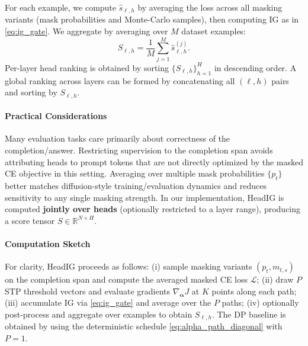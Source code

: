 For each example, we compute $\hat{s}_{\ell,h}$ by averaging the loss across all masking variants (mask probabilities and Monte-Carlo samples), then computing IG as in \eqref{eq:ig_gate}. We aggregate by averaging over $M$ dataset examples:
\begin{equation}
S_{\ell,h} = \frac{1}{M}\sum_{j=1}^{M} \hat{s}^{(j)}_{\ell,h}.
\end{equation}
Per-layer head ranking is obtained by sorting $\{S_{\ell,h}\}_{h=1}^{H}$ in descending order. A global ranking across layers can be formed by concatenating all $(\ell,h)$ pairs and sorting by $S_{\ell,h}$.

\paragraph*{Practical Considerations}
Many evaluation tasks care primarily about correctness of the completion/answer. Restricting supervision to the completion span avoids attributing heads to prompt tokens that are not directly optimized by the masked CE objective in this setting. Averaging over multiple mask probabilities $\{p_t\}$ better matches diffusion-style training/evaluation dynamics and reduces sensitivity to any single masking strength. In our implementation, HeadIG is computed \textbf{jointly over heads} (optionally restricted to a layer range), producing a score tensor $S \in \mathbb{R}^{N \times H}$.

\paragraph*{Computation Sketch}
For clarity, HeadIG proceeds as follows: (i) sample masking variants $(p_t,m_{t,s})$ on the completion span and compute the averaged masked CE loss $\mathcal{L}$; (ii) draw $P$ STP threshold vectors and evaluate gradients $\nabla_{\boldsymbol{\alpha}}J$ at $K$ points along each path; (iii) accumulate IG via \eqref{eq:ig_gate} and average over the $P$ paths; (iv) optionally post-process and aggregate over examples to obtain $S_{\ell,h}$. The DP baseline is obtained by using the deterministic schedule \eqref{eq:alpha_path_diagonal} with $P=1$.


